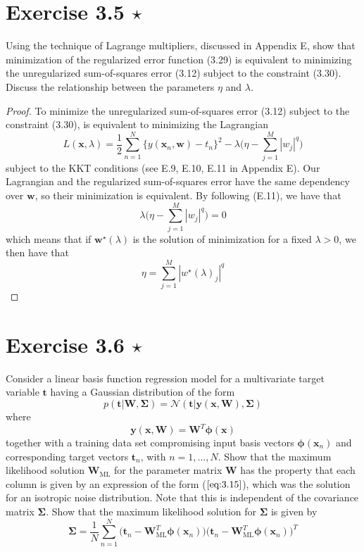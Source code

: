 \section*{Exercise 3.5 $\star$}
Using the technique of Lagrange multipliers, discussed in Appendix E,
show that minimization of the regularized error function (3.29)
is equivalent to minimizing the unregularized sum-of-squares error (3.12)
subject to the constraint (3.30). Discuss the relationship
between the parameters $\eta$ and $\lambda$.

\begin{proof}
    To minimize the unregularized sum-of-squares error (3.12) subject to
    the constraint (3.30), is equivalent to minimizing the Lagrangian
    \[
        L(\mathbf{x}, \lambda) = 
        \frac{1}{2}\sum_{n=1}^{N} \{y(\mathbf{x}_n, \mathbf{w}) - t_n\}^2 
        - \lambda\bigg(\eta - \sum_{j=1}^{M} |w_j|^q\bigg)
    \] subject to the KKT conditions (see E.9, E.10, E.11 in Appendix E).
    Our Lagrangian and the regularized sum-of-squares error have the same
    dependency over $\mathbf{w}$, so their minimization is equivalent.
    By following (E.11), we have that
     \[
         \lambda\bigg(\eta - \sum_{j=1}^{M} |w_j|^q\bigg) = 0
    \] 
    which means that if $\mathbf{w}^\star(\lambda)$ is the solution of minimization
    for a fixed $\lambda > 0$, we then have that 
     \[
         \eta = \sum_{j=1}^{M} |w^\star(\lambda)_j|^q
    \] 
\end{proof}

\section*{Exercise 3.6 $\star$}
Consider a linear basis function regression model
for a multivariate target variable $\mathbf{t}$ having 
a Gaussian distribution of the form
\begin{equation*}
    p(\mathbf{t} | \mathbf{W}, \mathbf{\Sigma})
    = \mathcal{N}(\mathbf{t} | \mathbf{y}(\mathbf{x}, \mathbf{W}), \mathbf{\Sigma})
    \tag{3.107}\label{eq:3.107}
\end{equation*}
where 
\begin{equation*}
    \mathbf{y}(\mathbf{x}, \mathbf{W}) = \mathbf{W}^T \bm{\phi}(\mathbf{x})
    \tag{3.108}\label{eq:3.108}
\end{equation*}
together with a training data set compromising input
basis vectors $\bm{\phi}(\mathbf{x}_n)$ and corresponding
target vectors $\mathbf{t}_n$, with $n = 1, \ldots, N$. Show
that the maximum likelihood solution $\mathbf{W}_{\text{ML}}$ for
the parameter matrix $\mathbf{W}$ has the property that each 
column is given by an expression of the form ($\ref{eq:3.15}$),
which was the solution for an isotropic noise distribution.
Note that this is independent of the covariance matrix
$\mathbf{\Sigma}$. Show that the maximum likelihood solution
for $\mathbf{\Sigma}$ is given by
\begin{equation*}
    \mathbf{\Sigma} = \frac{1}{N} \sum_{n=1}^{N} 
    \big(\mathbf{t}_n - \mathbf{W}_{\text{ML}}^T\bm{\phi}(\mathbf{x}_n)\big)
    \big(\mathbf{t}_n - \mathbf{W}_{\text{ML}}^T\bm{\phi}(\mathbf{x}_n)\big)^T
    \tag{3.109}\label{eq:3.109}
\end{equation*}

